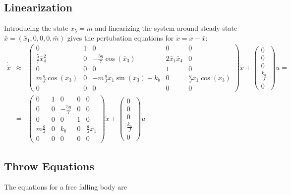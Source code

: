 \subsection{Linearization}

Introducing the state $x_{5}=m$ and linearizing the system around
steady state $\bar{x}=(\bar{x}_{1},0,0,0,\bar{m})$ gives the pertubation
equations for $\tilde{x}=x-\bar{x}$: 
\begin{eqnarray*}
\dot{\tilde{x}} & \approx & \begin{pmatrix}0 & 1 & 0 & 0 & 0\\
\frac{5}{7}\bar{x}_{4}^{2} & 0 & -\frac{5g}{7}\cos(\bar{x}_{3}) & 2\bar{x}_{1}\bar{x}_{4} & 0\\
0 & 0 & 0 & 1 & 0\\
\bar{m}\frac{g}{J}\cos(\bar{x}_{3}) & 0 & -\bar{m}\frac{g}{J}\bar{x}_{1}\sin(\bar{x}_{3})+k_{b} & 0 & \frac{g}{J}\bar{x}_{1}\cos(\bar{x}_{3})\\
0 & 0 & 0 & 0 & 0
\end{pmatrix}\tilde{x}+\begin{pmatrix}0\\
0\\
0\\
\frac{k_{u}}{J}\\
0
\end{pmatrix}u=\\
 & = & \begin{pmatrix}0 & 1 & 0 & 0 & 0\\
0 & 0 & -\frac{5g}{7} & 0 & 0\\
0 & 0 & 0 & 1 & 0\\
\bar{m}\frac{g}{J} & 0 & k_{b} & 0 & \frac{g}{J}\bar{x}_{1}\\
0 & 0 & 0 & 0 & 0
\end{pmatrix}\tilde{x}+\begin{pmatrix}0\\
0\\
0\\
\frac{k_{u}}{J}\\
0
\end{pmatrix}u
\end{eqnarray*}



\subsection{Throw Equations}

The equations for a free falling body are

